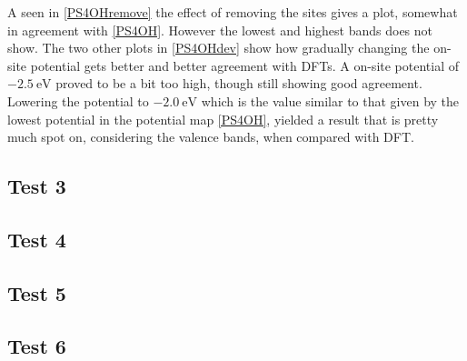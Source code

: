 A seen in \cref{PS4OHremove} the effect of removing the sites gives a plot, somewhat in agreement with \cref{PS4OH}. However the lowest and highest bands does not show. The two other plots in \cref{PS4OHdev} show how gradually changing the on-site potential gets better and better agreement with DFTs. A on-site potential of \(\SI{-2.5}{\electronvolt}\) proved to be a bit too high, though still showing good agreement. Lowering the potential to \(\SI{-2.0}{\electronvolt}\) which is the value similar to that given by the lowest potential in the potential map \cref{PS4OH}, yielded a result that is pretty much spot on, considering the valence bands, when compared with DFT. 
\subsection{Test 3}
\subsection{Test 4}
\subsection{Test 5}
\subsection{Test 6}

